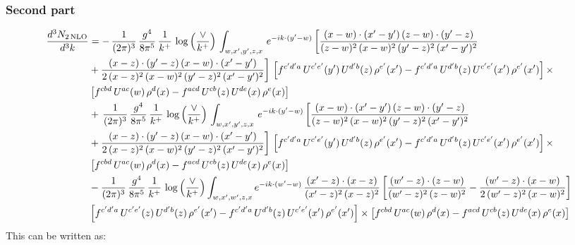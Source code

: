 \documentclass[9pt]{article}
\numberwithin{equation}{section}
\begin{document}
\subsubsection{Second part}
\begin{align}
 \frac{d^{3}N_{2\,\rm NLO}}{d^{3}k} & =    -\, \frac{1}{(2\pi)^{3}}\,\frac{g^{4}}{8\pi^{5}}\,\frac{1}{k^{+}}\,\log{\left(\frac{\vee}{k^{+}}\right)}\,\int_{w,x',y',z,x}\, e^{-ik\cdot (y'-w)}\,\bigg[\frac{(x-w)\cdot (x'-y')\,(z-w)\cdot (y'-z)}{(z-w)^{2}\,(x-w)^{2}\,(y'-z)^{2}\,(x'-y')^{2}}\notag \\ & +\frac{(x-z)\cdot (y'-z)\,(x-w)\cdot (x'-y')}{2\,(x-z)^{2}\,(x-w)^{2}\,(y'-z)^{2}\,(x'-y')^{2}}\bigg]\, \left[f^{c'd'a}\,U^{c'e'}(y')\,U^{d'b}(z)\,\rho^{e'}(x')-f^{c'd'a}\, 
    U^{d'b}(z)\,U^{c'e'}(x')\,\rho^{e'}(x')\right]\times\notag \\ &  \left[f^{cbd}\,U^{ac}(w)\,\rho^{d}(x) -f^{acd}\,U^{cb}(z)\,U^{de}(x)\,\rho^{e}(x)\right] \notag \\
&   +\, \frac{1}{(2\pi)^{3}}\,\frac{g^{4}}{8\pi^{5}}\,\frac{1}{k^{+}}\,\log{\left(\frac{\vee}{k^{+}}\right)}\,\int_{w,x',y',z,x}\, e^{-ik\cdot (y'-w)}\,\bigg[\frac{(x-w)\cdot (x'-y')\,(z-w)\cdot (y'-z)}{(z-w)^{2}\,(x-w)^{2}\,(y'-z)^{2}\,(x'-y')^{2}}\notag \\ &   +\frac{(x-z)\cdot (y'-z)\,(x-w)\cdot (x'-y')}{2\,(x-z)^{2}\,(x-w)^{2}\,(y'-z)^{2}\,(x'-y')^{2}}\bigg]\, \left[f^{c'd'a}\,U^{c'e'}(y')\,U^{d'b}(z)\,\rho^{e'}(x')-f^{c'd'a}\, 
    U^{d'b}(z)\,U^{c'e'}(x')\,\rho^{e'}(x')\right]\times\notag \\ &    \left[f^{cbd}\,U^{ac}(w)\,\rho^{d}(x) -f^{acd}\,U^{cb}(z)\,U^{de}(x)\,\rho^{e}(x)\right] \notag \\
&   -\frac{1}{(2\pi)^{3}}\,\frac{g^{4}}{8\pi^{5}}\,\frac{1}{k^{+}}\,\log{\left(\frac{\vee}{k^{+}}\right)}\int_{w,x',w',z,x} e^{-ik\cdot (w'-w)}\,\frac{(x'-z)\cdot (x-z)}{(x'-z)^{2}\,(x-z)^{2}}\,\bigg[\frac{(w'-z)\cdot (z-w)}{(w'-z)^{2}\,(z-w)^{2}}-\frac{(w'-z)\cdot (x-w)}{2\,(w'-z)^{2}\,(x-w)^{2}}\bigg]\notag \\
&   \left[f^{c'd'a}\,U^{c'e'}(z)\,U^{d'b}(z)\,\rho^{e'}(x')-f^{c'd'a}\, U^{d'b}(z)\,U^{c'e'}(x')\,\rho^{e'}(x')\right] \times\left[f^{cbd}\,U^{ac}(w)\,\rho^{d}(x) -f^{acd}\,U^{cb}(z)\,U^{de}(x)\,\rho^{e}(x)\right]
\end{align}
This can be written as:
\end{document}

